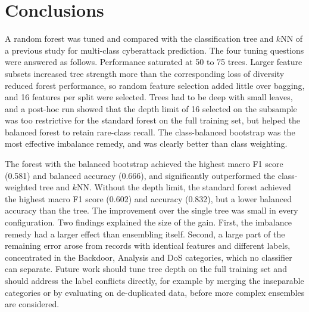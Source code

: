 \documentclass[conference,10pt]{IEEEtran}
\begin{document}
\section{Conclusions}\label{sec:concl}
A random forest was tuned and compared with the classification tree and $k$NN of a previous study for multi-class cyberattack prediction. The four tuning questions were answered as follows. Performance saturated at 50 to 75 trees. Larger feature subsets increased tree strength more than the corresponding loss of diversity reduced forest performance, so random feature selection added little over bagging, and 16 features per split were selected. Trees had to be deep with small leaves, and a post-hoc run showed that the depth limit of 16 selected on the subsample was too restrictive for the standard forest on the full training set, but helped the balanced forest to retain rare-class recall. The class-balanced bootstrap was the most effective imbalance remedy, and was clearly better than class weighting.

The forest with the balanced bootstrap achieved the highest macro F1 score (0.581) and balanced accuracy (0.666), and significantly outperformed the class-weighted tree and $k$NN. Without the depth limit, the standard forest achieved the highest macro F1 score (0.602) and accuracy (0.832), but a lower balanced accuracy than the tree. The improvement over the single tree was small in every configuration. Two findings explained the size of the gain. First, the imbalance remedy had a larger effect than ensembling itself. Second, a large part of the remaining error arose from records with identical features and different labels, concentrated in the Backdoor, Analysis and DoS categories, which no classifier can separate. Future work should tune tree depth on the full training set and should address the label conflicts directly, for example by merging the inseparable categories or by evaluating on de-duplicated data, before more complex ensembles are considered.
\end{document}
